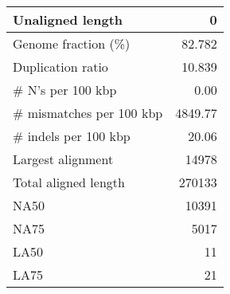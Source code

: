\documentclass[12pt,a4paper]{article}
\begin{document}
\begin{table}[ht]
\begin{center}
\begin{tabular}{|l*{1}{|r}|}
Unaligned length & 0 \\ \hline
Genome fraction (\%) & 82.782 \\ \hline
Duplication ratio & 10.839 \\ \hline
\# N's per 100 kbp & 0.00 \\ \hline
\# mismatches per 100 kbp & 4849.77 \\ \hline
\# indels per 100 kbp & 20.06 \\ \hline
Largest alignment & 14978 \\ \hline
Total aligned length & 270133 \\ \hline
NA50 & 10391 \\ \hline
NA75 & 5017 \\ \hline
LA50 & 11 \\ \hline
LA75 & 21 \\ \hline
\end{tabular}
\end{center}
\end{table}
\end{document}
